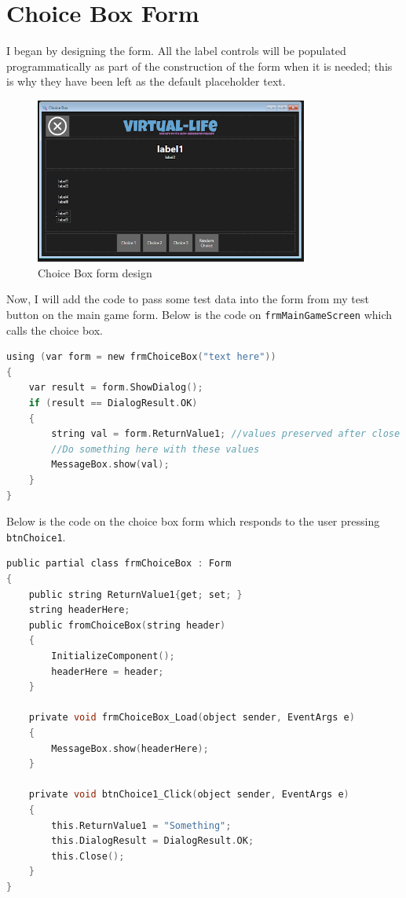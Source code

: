 \section{Choice Box Form}
I began by designing the form. All the label controls will be populated programmatically as part of the construction of the form when it is needed; this is why they have been left as the default placeholder text.
\begin{figure}[H]
    \centering
    \includegraphics[width=0.8\textwidth]{images/implementation/choiceBox1.png}
    \caption{Choice Box form design}
    \label{fig:implementation-choiceBox1}
\end{figure}
\noindent
Now, I will add the code to pass some test data into the form from my test button on the main game form. Below is the code on \verb|frmMainGameScreen| which calls the choice box.
\begin{lstlisting}[language=c, style=csharp, caption=Code which generates the choice box form and recieves its response]
using (var form = new frmChoiceBox("text here"))
{
    var result = form.ShowDialog();
    if (result == DialogResult.OK)
    {
        string val = form.ReturnValue1; //values preserved after close
        //Do something here with these values
        MessageBox.show(val);
    }
}
\end{lstlisting}
Below is the code on the choice box form which responds to the user pressing \verb|btnChoice1|.
\begin{lstlisting}[language=c, style=csharp, caption=Choice box form code to send the result to where it was called from]
public partial class frmChoiceBox : Form
{
    public string ReturnValue1{get; set; }
    string headerHere;
    public fromChoiceBox(string header)
    {
        InitializeComponent();
        headerHere = header;
    }
    
    private void frmChoiceBox_Load(object sender, EventArgs e)
    {
        MessageBox.show(headerHere);
    }
    
    private void btnChoice1_Click(object sender, EventArgs e)
    {
        this.ReturnValue1 = "Something";
        this.DialogResult = DialogResult.OK;
        this.Close();
    }
}
\end{lstlisting}
